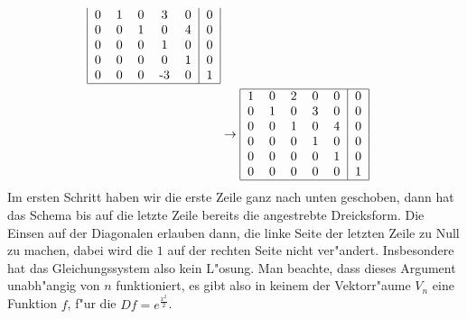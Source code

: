 \begin{loesung}
\begin{teilaufgaben}
\begin{align*}
\begin{tabular}{|ccccc|c|}
0&1&0&3&0&0\\
0&0&1&0&4&0\\
0&0&0&1&0&0\\
0&0&0&0&1&0\\
0&0&0&-3&0&1\\
\hline
\end{tabular}
\\
&\rightarrow
\begin{tabular}{|ccccc|c|}
\hline
1&0&2&0&0&0\\
0&1&0&3&0&0\\
0&0&1&0&4&0\\
0&0&0&1&0&0\\
0&0&0&0&1&0\\
0&0&0&0&0&1\\
\hline
\end{tabular}
\end{align*}
Im ersten Schritt haben wir die erste Zeile ganz nach unten geschoben,
dann hat das Schema bis auf die letzte Zeile bereits die angestrebte
Dreicksform. Die Einsen auf der Diagonalen erlauben dann, die linke
Seite der letzten Zeile zu Null zu machen, dabei wird die $1$ auf der
rechten Seite nicht ver"andert. Insbesondere hat das Gleichungssystem
also kein L"osung. Man beachte, dass dieses Argument unabh"angig von
$n$ funktioniert, es gibt also in keinem der Vektorr"aume $V_n$
eine Funktion $f$, f"ur die $Df=e^{\frac{x^2}2}$.
\end{teilaufgaben}
\end{loesung}

